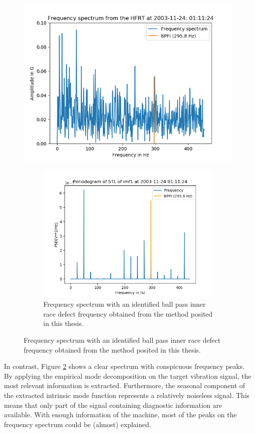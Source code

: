 \documentclass[../Main/thesis.tex]{subfiles}
\begin{document}
	\begin{figure}[H]
		\centering
		\includegraphics[width=0.7\linewidth]{../fig/hfrt}
		\caption{Frequency spectrum with an identified ball pass inner race defect frequency obtained from the high frequency resonance technique (HFRT).}
		\label{fig:hfrt-method}
		
		\begin{figure}[H]
			\centering
			\includegraphics[width=0.7\linewidth]{../fig/periodogram_bpfi/end_imf1_bpfi}
			\caption{Frequency spectrum with an identified ball pass inner race defect frequency obtained from the method posited in this thesis.}
			\label{fig:yapi-method}
		\end{figure}
	\end{figure}
\justify
In contrast, Figure \ref{fig:yapi-method} shows a clear spectrum with conspicuous frequency peaks. By applying the empirical mode decomposition on the target vibration signal, the most relevant information is extracted. Furthermore, the seasonal component of the extracted intrinsic mode function represents a relatively noiseless signal. This means that only part of the signal containing diagnostic information are available. With enough information of the machine, most of the peaks on the frequency spectrum could be (almost) explained. 
\end{document}
